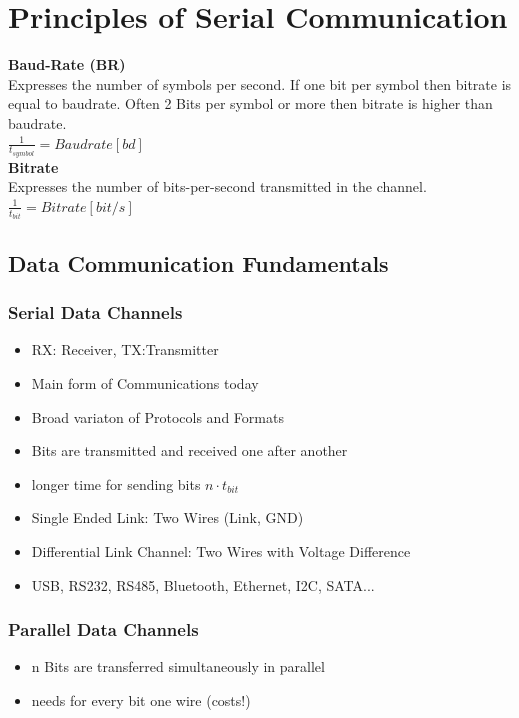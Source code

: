 \section{Principles of Serial Communication}
\begin{multicols}{2}
	\textbf{Baud-Rate (BR)}\\
	Expresses the number of symbols per second. If one bit per symbol then bitrate is equal to baudrate. Often 2 Bits per symbol or more then bitrate is higher than baudrate.\\
	$\frac{1}{t_{symbol}}=Baudrate [bd]$\\
	\textbf{Bitrate}\\
	Expresses the number of bits-per-second transmitted in the channel. \\
	$\frac{1}{t_{bit}}=Bitrate [bit/s]$\\
\end{multicols}
\subsection{Data Communication Fundamentals }
	\subsubsection{Serial Data Channels}
	\begin{itemize}
		\item RX: Receiver, TX:Transmitter
		\item Main form of Communications today
		\item Broad variaton of Protocols and Formats
		\item Bits are transmitted and received one after another
		\item longer time for sending bits $n\cdot t_{bit}$
		\item Single Ended Link: Two Wires (Link, GND)
		\item Differential Link Channel: Two Wires with Voltage Difference
		\item USB, RS232, RS485, Bluetooth, Ethernet, I2C, SATA...
	\end{itemize}
\subsubsection{Parallel Data Channels}
	\begin{itemize}
		\item n Bits are transferred simultaneously in parallel
		\item needs for every bit one wire (costs!)
	\end{itemize}
	
